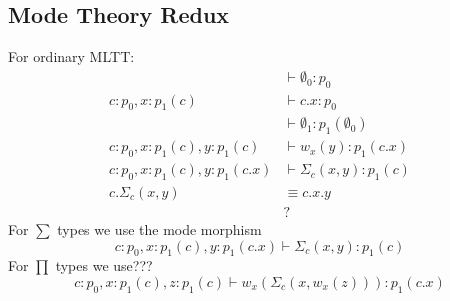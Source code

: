 \documentclass[10pt]{article}
\newcommand{\yields}{\vdash}
\begin{document}
\subsection*{Mode Theory Redux}
For ordinary MLTT:
\begin{align*}
&\yields \emptyset_0 : p_0 \\
c : p_0, x : p_1(c) &\yields c.x : p_0 \\
&\yields \emptyset_1 : p_1(\emptyset_0) \\
c : p_0, x : p_1(c), y : p_1(c) &\yields w_x(y) : p_1(c.x) \\
c : p_0, x : p_1(c), y : p_1(c.x) &\yields \Sigma_c(x,y) : p_1(c) \\
c.\Sigma_c(x,y) &\equiv c.x.y \\
&?
\end{align*}
For $\sum$ types we use the mode morphism \[ c : p_0, x : p_1(c), y : p_1(c.x) \yields \Sigma_c(x,y) : p_1(c) \]
For $\prod$ types we use???
 \[ c : p_0, x : p_1(c), z : p_1(c) \yields w_x(\Sigma_c(x,w_x(z))) : p_1(c.x) \]
\end{document}
